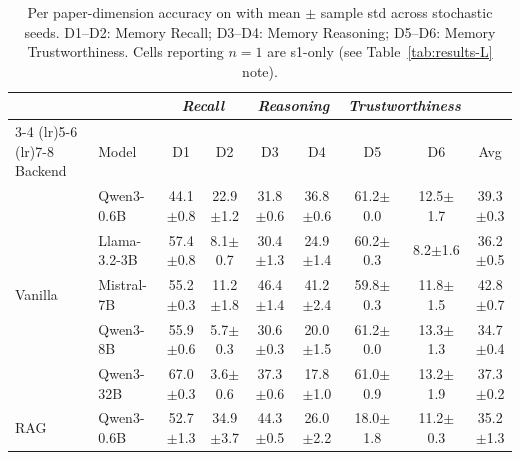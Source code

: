 \begin{table}[t]
\centering
\caption{Per paper-dimension accuracy on \benchL{} with mean $\pm$ sample std across stochastic seeds. D1--D2: Memory Recall; D3--D4: Memory Reasoning; D5--D6: Memory Trustworthiness. Cells reporting $n = 1$ are s1-only (see Table~\ref{tab:results-L} note).}
\label{tab:results-L-full}
\scriptsize
\setlength{\tabcolsep}{3pt}
\begin{tabular}{@{}ll cccccc c@{}}
\toprule
& & \multicolumn{2}{c}{\textit{Recall}} & \multicolumn{2}{c}{\textit{Reasoning}} & \multicolumn{2}{c}{\textit{Trustworthiness}} & \\
\cmidrule(lr){3-4} \cmidrule(lr){5-6} \cmidrule(lr){7-8}
Backend & Model & D1 & D2 & D3 & D4 & D5 & D6 & Avg \\
\midrule
\multirow{5}{*}{Vanilla}
  & Qwen3-0.6B     & 44.1{\scriptsize$\pm$0.8} & 22.9{\scriptsize$\pm$1.2} & 31.8{\scriptsize$\pm$0.6} & 36.8{\scriptsize$\pm$0.6} & 61.2{\scriptsize$\pm$0.0} & 12.5{\scriptsize$\pm$1.7} & 39.3{\scriptsize$\pm$0.3} \\

  & Llama-3.2-3B   & 57.4{\scriptsize$\pm$0.8} & 8.1{\scriptsize$\pm$0.7} & 30.4{\scriptsize$\pm$1.3} & 24.9{\scriptsize$\pm$1.4} & 60.2{\scriptsize$\pm$0.3} & 8.2{\scriptsize$\pm$1.6} & 36.2{\scriptsize$\pm$0.5} \\

  & Mistral-7B     & 55.2{\scriptsize$\pm$0.3} & 11.2{\scriptsize$\pm$1.8} & 46.4{\scriptsize$\pm$1.4} & 41.2{\scriptsize$\pm$2.4} & 59.8{\scriptsize$\pm$0.3} & 11.8{\scriptsize$\pm$1.5} & 42.8{\scriptsize$\pm$0.7} \\

  & Qwen3-8B       & 55.9{\scriptsize$\pm$0.6} & 5.7{\scriptsize$\pm$0.3} & 30.6{\scriptsize$\pm$0.3} & 20.0{\scriptsize$\pm$1.5} & 61.2{\scriptsize$\pm$0.0} & 13.3{\scriptsize$\pm$1.3} & 34.7{\scriptsize$\pm$0.4} \\

  & Qwen3-32B      & 67.0{\scriptsize$\pm$0.3} & 3.6{\scriptsize$\pm$0.6} & 37.3{\scriptsize$\pm$0.6} & 17.8{\scriptsize$\pm$1.0} & 61.0{\scriptsize$\pm$0.9} & 13.2{\scriptsize$\pm$1.9} & 37.3{\scriptsize$\pm$0.2} \\
\midrule
\multirow{5}{*}{RAG}
  & Qwen3-0.6B     & 52.7{\scriptsize$\pm$1.3} & 34.9{\scriptsize$\pm$3.7} & 44.3{\scriptsize$\pm$0.5} & 26.0{\scriptsize$\pm$2.2} & 18.0{\scriptsize$\pm$1.8} & 11.2{\scriptsize$\pm$0.3} & 35.2{\scriptsize$\pm$1.3} \\


\end{tabular}
\end{table}

